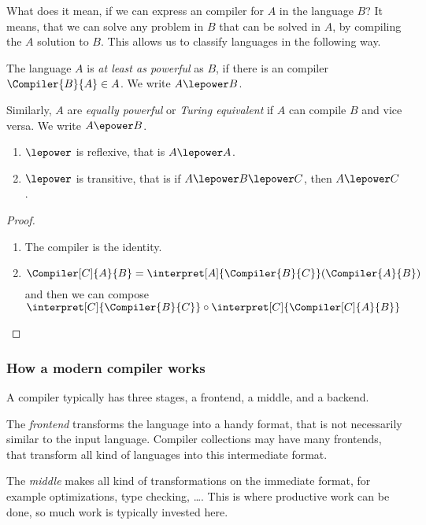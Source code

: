 What does it mean, if we can express an compiler for $A$ in the language 
$B$? It means, that we can solve any problem in $B$ that can be solved in $A$, 
by compiling the $A$ solution to $B$. This allows us to classify languages 
in the following way.

\begin{defn}
	\label{def:power}
	The language $A$ is \emph{at least as powerful} as $B$, if there is an 
	compiler $\Compiler{B}{A}\in A$. We write $A \lepower B$.

	Similarly, $A$ are \emph{equally powerful} or \emph{Turing equivalent} if $A$
	can compile $B$ and vice versa. We write $A \epower B$.
\end{defn}

\begin{theorem}
	\begin{enumerate}
		\item $\lepower$ is reflexive, that is $A\lepower A$.
		\item $\lepower$ is transitive, that is if $A\lepower B\lepower C$, then $A\lepower C$.
	\end{enumerate}
\end{theorem}
\begin{proof}
	\begin{enumerate}
		\item The compiler is the identity.
		\item \[\Compiler[C]{A}{B} = \interpret[A]{\Compiler{B}{C}}(\Compiler{A}{B})\]
			and then we can compose $\interpret[C]{\Compiler{B}{C}} \circ \interpret[C]{\Compiler[C]{A}{B}}$
	\end{enumerate}
\end{proof}

\subsubsection{How a modern compiler works}
A compiler typically has three stages, a frontend, a middle, and a backend.

The \emph{frontend} transforms the language into a handy format, that is not 
necessarily similar to the input language. Compiler collections may have many 
frontends, that transform all kind of languages into this intermediate format.

The \emph{middle} makes all kind of transformations on the immediate format, 
for example optimizations, type checking, \dots. This is where productive 
work can be done, so much work is typically invested here.

